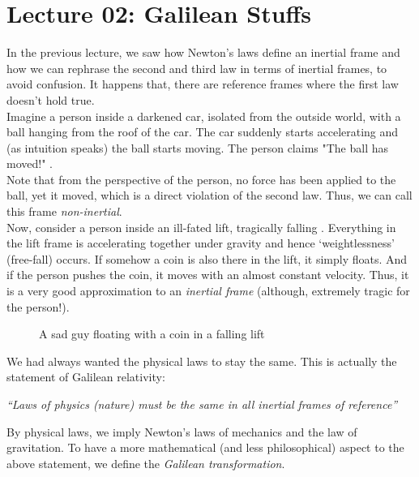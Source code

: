 \section*{Lecture 02: Galilean Stuffs}
In the previous lecture, we saw how Newton's laws define an inertial frame and how we can rephrase the second and third law in terms of inertial frames, to avoid confusion. It happens that, there are reference frames where the first law doesn't hold true. \\[0.2cm]
Imagine a person inside a darkened car, isolated from the outside world, with a ball hanging from the roof of the car. The car suddenly starts accelerating and (as intuition speaks) the ball starts moving. The person claims "The ball has moved!" .\\[0.2cm] Note that from the perspective of the person, no force has been applied to the ball, yet it moved, which is a direct violation of the second law. Thus, we can call this frame \textit{non-inertial}. \\[0.2cm]
Now, consider a person inside an ill-fated lift, tragically falling .  Everything in the lift frame is accelerating together under gravity and hence `weightlessness' (free-fall) occurs. If somehow a coin is also there in the lift, it simply floats. And if the person pushes the coin, it moves with an almost constant velocity. Thus, it is a very good approximation to an \textit{inertial frame} (although, extremely tragic for the person!).
\begin{figure}[H]
    \centering 
    
    \caption{A sad guy floating with a coin in a falling lift }
\end{figure}
\noindent
We had always wanted the physical laws to stay the same. This is actually the statement of Galilean relativity:
\begin{center}
    \itshape
    ``Laws of physics (nature) must be the same in all inertial frames of reference'' 
\end{center}
By physical laws, we imply Newton's laws of mechanics and the law of gravitation. To have a more mathematical (and less philosophical) aspect to the above statement, we define the \textit{Galilean transformation}.
